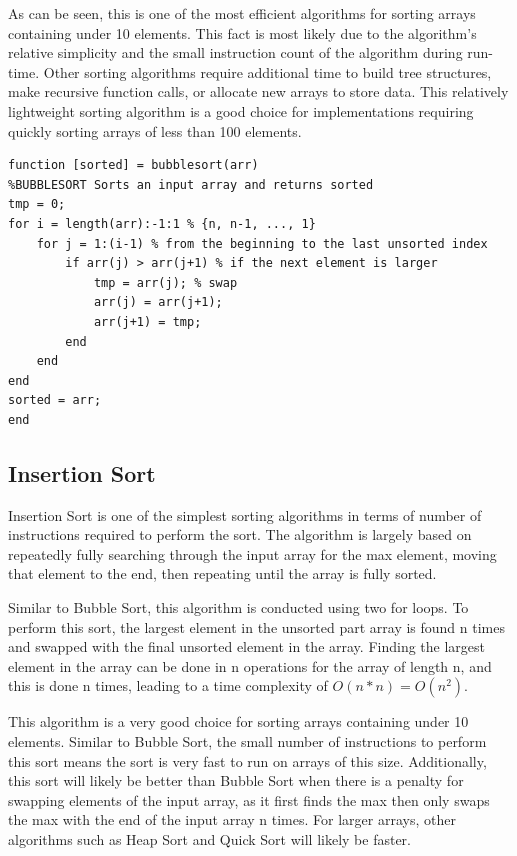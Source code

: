 \documentclass[a4paper]{article}
\begin{document}
As can be seen, this is one of the most efficient algorithms for sorting arrays containing under 10 elements. This fact is most likely due to the algorithm’s relative simplicity and the small instruction count of the algorithm during run-time. Other sorting algorithms require additional time to build tree structures, make recursive function calls, or allocate new arrays to store data. This relatively lightweight sorting algorithm is a good choice for implementations requiring quickly sorting arrays of less than 100 elements.

\begin{lstlisting}
function [sorted] = bubblesort(arr)
%BUBBLESORT Sorts an input array and returns sorted
tmp = 0;
for i = length(arr):-1:1 % {n, n-1, ..., 1}
    for j = 1:(i-1) % from the beginning to the last unsorted index
        if arr(j) > arr(j+1) % if the next element is larger
            tmp = arr(j); % swap
            arr(j) = arr(j+1);
            arr(j+1) = tmp;
        end
    end
end
sorted = arr;
end
\end{lstlisting}

\subsection{Insertion Sort}
Insertion Sort is one of the simplest sorting algorithms in terms of number of instructions required to perform the sort. The algorithm is largely based on repeatedly fully searching through the input array for the max element, moving that element to the end, then repeating until the array is fully sorted.

Similar to Bubble Sort, this algorithm is conducted using two for loops. To perform this sort, the largest element in the unsorted part array is found n times and swapped with the final unsorted element in the array. Finding the largest element in the array can be done in n operations for the array of length n, and this is done n times, leading to a time complexity of $O(n*n) = O(n^2)$.

This algorithm is a very good choice for sorting arrays containing under 10 elements. Similar to Bubble Sort, the small number of instructions to perform this sort means the sort is very fast to run on arrays of this size. Additionally, this sort will likely be better than Bubble Sort when there is a penalty for swapping elements of the input array, as it first finds the max then only swaps the max with the end of the input array n times. For larger arrays, other algorithms such as Heap Sort and Quick Sort will likely be faster.
\end{document}

